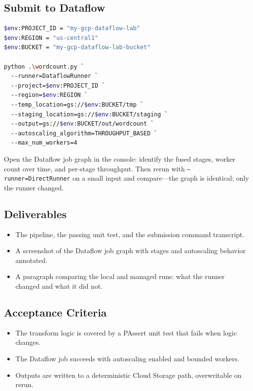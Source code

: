 \subsection{Submit to Dataflow}
\begin{lstlisting}[language=bash,caption={Running WordCount on Dataflow with autoscaling from PowerShell.}]
$env:PROJECT_ID = "my-gcp-dataflow-lab"
$env:REGION = "us-central1"
$env:BUCKET = "my-gcp-dataflow-lab-bucket"

python .\wordcount.py `
  --runner=DataflowRunner `
  --project=$env:PROJECT_ID `
  --region=$env:REGION `
  --temp_location=gs://$env:BUCKET/tmp `
  --staging_location=gs://$env:BUCKET/staging `
  --output=gs://$env:BUCKET/out/wordcount `
  --autoscaling_algorithm=THROUGHPUT_BASED `
  --max_num_workers=4
\end{lstlisting}

Open the Dataflow job graph in the console: identify the fused stages, worker count over time, and per-stage throughput. Then rerun with \texttt{--runner=DirectRunner} on a small input and compare---the graph is identical; only the runner changed.

\subsection*{Deliverables}
\begin{itemize}
    \item The pipeline, the passing unit test, and the submission command transcript.
    \item A screenshot of the Dataflow job graph with stages and autoscaling behavior annotated.
    \item A paragraph comparing the local and managed runs: what the runner changed and what it did not.
\end{itemize}

\subsection*{Acceptance Criteria}
\begin{itemize}
    \item The transform logic is covered by a PAssert unit test that fails when logic changes.
    \item The Dataflow job succeeds with autoscaling enabled and bounded workers.
    \item Outputs are written to a deterministic Cloud Storage path, overwritable on rerun.
\end{itemize}

